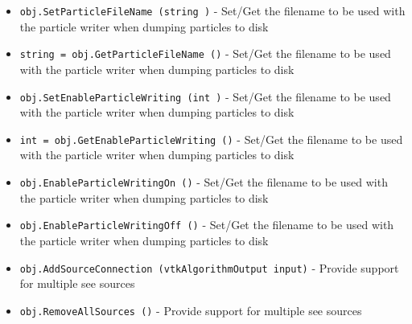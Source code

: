 \begin{itemize}
\item  \verb|obj.SetParticleFileName (string )| -  Set/Get the filename to be used with the particle writer when
 dumping particles to disk    

\item  \verb|string = obj.GetParticleFileName ()| -  Set/Get the filename to be used with the particle writer when
 dumping particles to disk    

\item  \verb|obj.SetEnableParticleWriting (int )| -  Set/Get the filename to be used with the particle writer when
 dumping particles to disk    

\item  \verb|int = obj.GetEnableParticleWriting ()| -  Set/Get the filename to be used with the particle writer when
 dumping particles to disk    

\item  \verb|obj.EnableParticleWritingOn ()| -  Set/Get the filename to be used with the particle writer when
 dumping particles to disk    

\item  \verb|obj.EnableParticleWritingOff ()| -  Set/Get the filename to be used with the particle writer when
 dumping particles to disk    

\item  \verb|obj.AddSourceConnection (vtkAlgorithmOutput input)| -  Provide support for multiple see sources

\item  \verb|obj.RemoveAllSources ()| -  Provide support for multiple see sources

\end{itemize}
